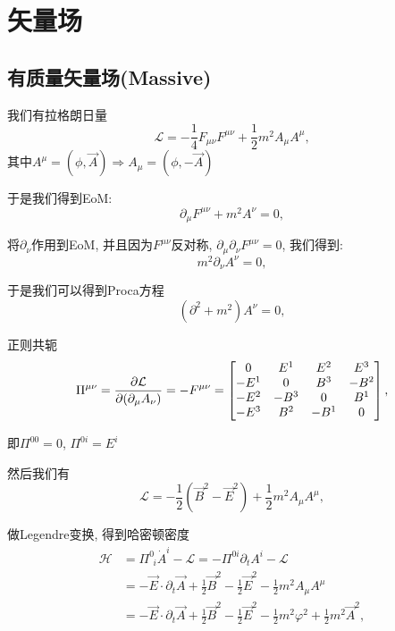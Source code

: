 \section{矢量场}
\subsection{有质量矢量场(Massive)}
我们有拉格朗日量
\begin{equation}
    \mathcal L=-\frac14 F_{\mu\nu}F^{\mu\nu}+\frac12 m^2 A_\mu A^\mu,
\end{equation}
其中$A^\mu=(\phi, \vec A)\Rightarrow A_\mu=(\phi, -\vec A)$

于是我们得到EoM:
\begin{equation}
    \partial_\mu F^{\mu\nu}+m^2 A^\nu=0,
\end{equation}

将$\partial_\nu$作用到EoM, 并且因为$F^{\mu\nu}$反对称, $\partial_\mu\partial_\nu F^{\mu\nu}=0$, 我们得到:
\begin{equation}
    m^2\partial_\nu A^\nu=0,
\end{equation}

于是我们可以得到Proca方程
\begin{equation}
    (\partial^2+m^2)A^\nu=0,
\end{equation}

正则共轭
\begin{equation}
    \Pi^{\mu\nu}=\frac{\partial \mathcal L}{\partial (\partial_\mu A_\nu)}=-F^{\mu\nu}=\begin{bmatrix}
        0 & E^1 & E^2 & E^3\\
        -E^1 & 0 & B^3 & -B^2\\
        -E^2 & -B^3 & 0 & B^1\\
        -E^3 & B^2 & -B^1 & 0
    \end{bmatrix},
\end{equation}

即$\Pi^{00}=0$, $\Pi^{0i}=E^i$

然后我们有
\begin{equation}
    \mathcal L=-\frac12(\vec B^2-\vec E^2)+\frac12m^2A_{\mu}A^{\mu},
\end{equation}

做Legendre变换, 得到哈密顿密度
\begin{align}
    \mathcal H&=\Pi^0_{~~i}\dot A^i-\mathcal L=-\Pi^{0i}\partial_t A^i-\mathcal L\\
    &=-\vec E\cdot\partial_t\vec A+\frac12 \vec  B^2-\frac12 \vec  E^2-\frac12m^2A_{\mu}A^{\mu}\\
    &=-\vec E\cdot\partial_t\vec A+\frac12 \vec B^2-\frac12 \vec  E^2-\frac12m^2\varphi^2+\frac12m^2\vec A^2,
\end{align}

